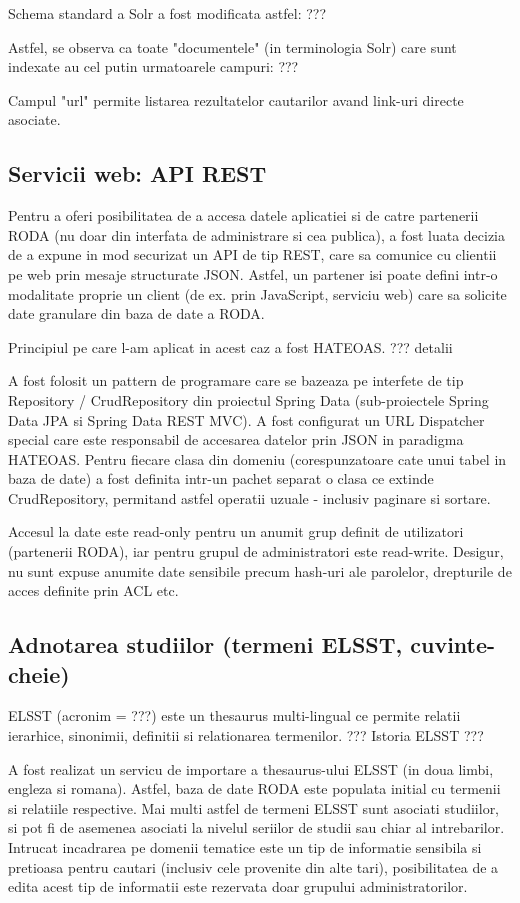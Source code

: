 \documentclass[a4paper, 10pt]{article}
\begin{document}
{Schema standard a Solr a fost modificata astfel:
??? 

Astfel, se observa ca toate "documentele" (in terminologia Solr) care sunt indexate au cel putin urmatoarele campuri:
???

Campul "url" permite listarea rezultatelor cautarilor avand link-uri directe asociate.

\subsection{Servicii web: API REST}

Pentru a oferi posibilitatea de a accesa datele aplicatiei si de catre partenerii RODA 
(nu doar din interfata de administrare si cea publica), a fost luata decizia de a expune in mod securizat
un API de tip REST, care sa comunice cu clientii pe web prin mesaje structurate JSON.
Astfel, un partener isi poate defini intr-o modalitate proprie un client (de ex. prin JavaScript, serviciu web)
care sa solicite date granulare din baza de date a RODA.

Principiul pe care l-am aplicat in acest caz a fost HATEOAS. 
??? detalii

A fost folosit un pattern de programare care se bazeaza pe interfete de tip Repository / CrudRepository 
din proiectul Spring Data (sub-proiectele Spring Data JPA si Spring Data REST MVC). 
A fost configurat un URL Dispatcher special care este responsabil de accesarea datelor prin JSON in paradigma HATEOAS. 
Pentru fiecare clasa din domeniu (corespunzatoare cate unui tabel in baza de date) 
a fost definita intr-un pachet separat o clasa ce extinde CrudRepository, 
permitand astfel operatii uzuale - inclusiv paginare si sortare.

Accesul la date este read-only pentru un anumit grup definit de utilizatori (partenerii RODA), 
iar pentru grupul de administratori este read-write. 
Desigur, nu sunt expuse anumite date sensibile precum hash-uri ale parolelor, drepturile de acces definite prin ACL etc.

\subsection{Adnotarea studiilor (termeni ELSST, cuvinte-cheie)}

ELSST (acronim = ???) este un thesaurus multi-lingual ce permite relatii ierarhice, sinonimii, definitii si relationarea termenilor.
??? Istoria ELSST ???

A fost realizat un servicu de importare a thesaurus-ului ELSST (in doua limbi, engleza si romana). 
Astfel, baza de date RODA este populata initial cu termenii si relatiile respective.
Mai multi astfel de termeni ELSST sunt asociati studiilor, si pot fi de asemenea asociati la nivelul seriilor de studii sau chiar al intrebarilor.
Intrucat incadrarea pe domenii tematice este un tip de informatie sensibila si pretioasa pentru cautari 
(inclusiv cele provenite din alte tari),
posibilitatea de a edita acest tip de informatii este rezervata doar grupului administratorilor.

}
\end{document}
